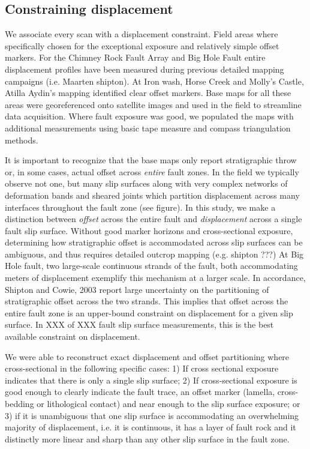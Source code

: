 \documentclass[12pt,a4paper]{article}
\begin{document}
\subsection{Constraining displacement}

We associate every scan with a displacement constraint. Field areas where specifically chosen for the exceptional exposure and relatively simple offset markers. For the Chimney Rock Fault Array and Big Hole Fault entire displacement profiles have been measured during previous detailed mapping campaigns (i.e. Maarten  shipton). At Iron wash, Horse Creek and Molly’s Castle, Atilla Aydin’s mapping identified clear offset markers. Base maps for all these areas were georeferenced onto satellite images and used in the field to streamline data acquisition. Where fault exposure was good, we populated the maps with additional measurements using basic tape measure and compass triangulation methods. 

It is important to recognize that the base maps only report stratigraphic throw or, in some cases, actual offset across \textit{entire} fault zones. In the field we typically observe not one, but many slip surfaces along with very complex networks of deformation bands and sheared joints which partition displacement across many interfaces throughout the fault zone (see figure). In this study, we make a distinction between \textit{offset} across the entire fault and \textit{displacement} across a single fault slip surface. Without good marker horizons and cross-sectional exposure, determining how stratigraphic offset is accommodated across slip surfaces can be ambiguous, and thus requires detailed outcrop mapping (e.g. shipton ???) At Big Hole fault, two large-scale continuous strands of the fault, both accommodating meters of displacement exemplify this mechanism at a larger scale. In accordance, Shipton and Cowie, 2003 report large uncertainty on the partitioning of stratigraphic offset across the two strands. This implies that offset across the entire fault zone is an upper-bound constraint on displacement for a given slip surface. In XXX of XXX fault slip surface measurements, this is the best available constraint on displacement. 

We were able to reconstruct exact displacement and offset partitioning where cross-sectional in the following specific cases: 1) If cross sectional exposure indicates that there is only a single slip surface; 2) If cross-sectional exposure is good enough to clearly indicate the fault trace, an offset marker (lamella, cross-bedding or lithological contact) and near enough to the slip surface exposure; or 3) if it is unambiguous that one slip surface is accommodating an overwhelming majority of displacement, i.e. it is continuous, it has a layer of fault rock and it distinctly more linear and sharp than any other slip surface in the fault zone. 
\end{document}
